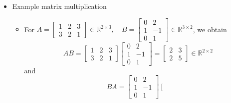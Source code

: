 \documentclass{article}
\begin{document}
\begin{itemize}
\[\begin{array}{cccc}
                a_{21} & a_{22} & \cdots & a_{2m} \\
                \vdots & \vdots & \ddots & \vdots \\
                a_{n1} & a_{n2} & \cdots & a_{nm} 
    \end{array} \right], \quad a_{ij} \in \mathbb{R}
    \]
    \begin{itemize}
        \item By convention $(1,N)$-matrices are called rows and $(M,1)$-matrices are called columns (row/column vectors)
        \item $\mathbb{R}^{M \times N}$ is the set of all real-valued $(M,N)$-matrices
    \end{itemize}
    \item Example matrix multiplication
    \begin{itemize}
        \item For $A = \left[ \begin{array}{ccc}
            1 & 2 & 3 \\
            3 & 2 & 1
        \end{array} \right] \in \mathbb{R}^{2 \times 3}, \quad B = \left[ \begin{array}{cc}
            0 & 2 \\
            1 & -1 \\
            0 & 1
        \end{array} \right] \in \mathbb{R}^{3 \times 2}$, we obtain
        \[
        AB = \left[ \begin{array}{ccc}
            1 & 2 & 3 \\
            3 & 2 & 1
        \end{array} \right] \left[ \begin{array}{cc}
            0 & 2 \\
            1 & -1 \\
            0 & 1
        \end{array} \right] = \left[ \begin{array}{cc}
            2 & 3 \\
            2 & 5
        \end{array} \right] \in \mathbb{R}^{2 \times 2}
        \]
        and
        \[
        BA = \left[ \begin{array}{cc}
            0 & 2 \\
            1 & -1 \\
            0 & 1
        \end{array} \right] \left[ \begin{array}{ccc}

\end{array}\]
\end{itemize}
\end{itemize}
\end{document}
